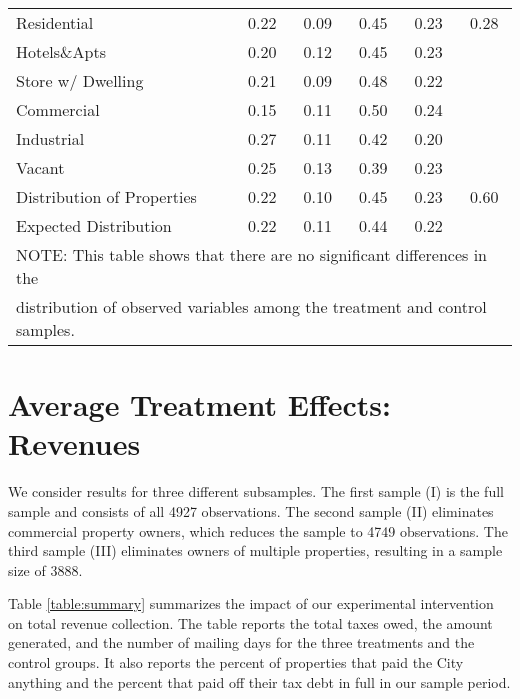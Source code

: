 \documentclass[12pt,titlepage]{article}
\begin{document}
\begin{table}[ht]
\begin{tabular}{|l|c|c|c|c|c|}
Residential & 0.22 & 0.09 & 0.45 & 0.23 & 0.28 \\ 
  Hotels\&Apts & 0.20 & 0.12 & 0.45 & 0.23 &  \\ 
  Store w/ Dwelling & 0.21 & 0.09 & 0.48 & 0.22 &  \\ 
  Commercial & 0.15 & 0.11 & 0.50 & 0.24 &  \\ 
  Industrial & 0.27 & 0.11 & 0.42 & 0.20 &  \\ 
  Vacant & 0.25 & 0.13 & 0.39 & 0.23 &  \\ 
   \hline
Distribution of Properties & 0.22 & 0.10 & 0.45 & 0.23 & 0.60 \\ 
   \hline
Expected Distribution & 0.22 & 0.11 & 0.44 & 0.22 &  \\ 
   \hline
\multicolumn{6}{|l|}{NOTE: This table shows that there are no significant differences in the} \\
\multicolumn{6}{|l|}{distribution of observed variables among the treatment and control samples.} \\ 
\hline
\end{tabular}
\end{table}


\section{Average Treatment Effects: Revenues}


We consider results for three different subsamples.  The first sample
(I) is the full sample and consists of all 4927 observations. The
second sample (II) eliminates commercial property owners, which
reduces the sample to 4749 observations. The third sample (III)
eliminates owners of multiple properties, resulting in a sample size
of 3888.

Table \ref{table:summary} summarizes the impact of our experimental
intervention on total revenue collection.  The table reports the total
taxes owed, the amount generated, and the number of mailing days for
the three treatments and the control groups. It also reports the
percent of properties that paid the City anything and the percent that
paid off their tax debt in full in our sample period.
\end{document}
